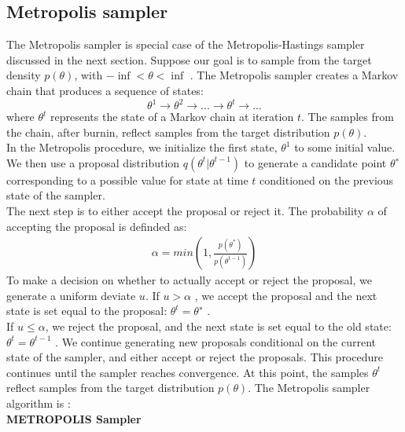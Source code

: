 \subsection{Metropolis sampler}
The Metropolis sampler is special case of the Metropolis-Hastings sampler discussed in the next section. Suppose our goal is to sample from the target density $p(\theta)$, with $-\inf < \theta < \inf$ . The Metropolis sampler creates a Markov chain that produces a sequence of states:
$$
\theta^1 \rightarrow  \theta^2 \rightarrow. . .  \rightarrow \theta^t  \rightarrow . . .
$$
where $\theta^t$ represents the state of a Markov chain at iteration $t$. 
The samples from the chain, after burnin, reflect samples from the target distribution $p(θ)$.\\
In the Metropolis procedure, we initialize the first state, $\theta^1$ to some initial value. We then use a proposal distribution $q(\theta^t|\theta^{t-1})$ to generate a candidate point $\theta^∗$ corresponding to a possible value for state at time $t$ conditioned on the previous state of the sampler. \\
The next step is to either accept the proposal or reject it. The probability $\alpha$ of accepting the proposal is definded as:\\
\begin{eqnarray} \label{eqn: Acceptance Ratio Metropolis}
\alpha = min(1, \frac{p(\theta^*)}{p(\theta^{t-1})})
\end{eqnarray}
To make a decision on whether to actually accept or reject the proposal, we generate a
uniform deviate $u$. If $u > \alpha$ , we accept the proposal and the next state is set equal to the proposal:  $\theta^t=\theta^{∗}$ . \\
 If $u \leq \alpha$, we reject the proposal, and the next state is set equal to the
old state: $\theta^t=\theta^{t-1}$ . We continue generating new proposals conditional on the current state of the sampler, and either accept or reject the proposals. This procedure continues until the sampler reaches convergence. At this point, the samples $\theta^t$ reflect samples from the target distribution $p(\theta)$. The Metropolis sampler algorithm is :\\
{\bf METROPOLIS Sampler}\\[.4cm]
